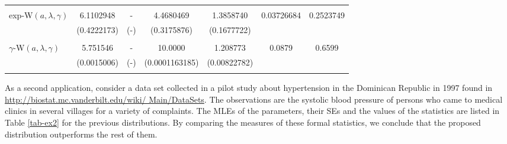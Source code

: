 \documentclass[12pt,a4paper]{article} %
\begin{document}
\begin{table}[!htb]
\begin{tabular}{lcccccc}
 & & & & &  \\
exp-W$(a,\lambda,\gamma)$   &    6.1102948   & - &   4.4680469 &  1.3858740 &   0.03726684   & 0.2523749 \\
&   (0.4222173) & (-) & (0.3175876) & (0.1677722)   &  & \\

 & & & & &  \\
$\gamma$-W$(a,\lambda,\gamma)$    & 5.751546  & - &  10.0000 & 1.208773&  0.0879 & 0.6599  \\
&  (0.0015006)&  (-)&  (0.0001163185) &(0.00822782)    &  & \\

 & & & & &  \\





                                                     \hline
\end{tabular}
\end{table}



As a second application, consider a data set collected in a pilot study about hypertension in the Dominican Republic
in 1997 found in \url{http://biostat.mc.vanderbilt.edu/wiki/
Main/DataSets}. The observations are the systolic blood pressure of persons who came to medical clinics in
several villages for a variety of complaints. The MLEs of the parameters, their SEs and the values of the statistics are
listed in Table \ref{tab-ex2} for the previous distributions. By comparing the measures of these formal statistics,
we conclude that the proposed distribution outperforms the rest of them.
\end{document}
